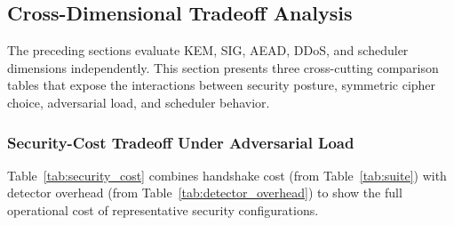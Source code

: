 \subsection{Cross-Dimensional Tradeoff Analysis}
\label{sec:tradeoff}

The preceding sections evaluate KEM, SIG, AEAD, DDoS, and scheduler
dimensions independently.  This section presents three cross-cutting
comparison tables that expose the interactions between security posture,
symmetric cipher choice, adversarial load, and scheduler behavior.

\subsubsection{Security-Cost Tradeoff Under Adversarial Load}

Table~\ref{tab:security_cost} combines handshake cost (from
Table~\ref{tab:suite}) with detector overhead (from
Table~\ref{tab:detector_overhead}) to show the full operational cost
of representative security configurations.


